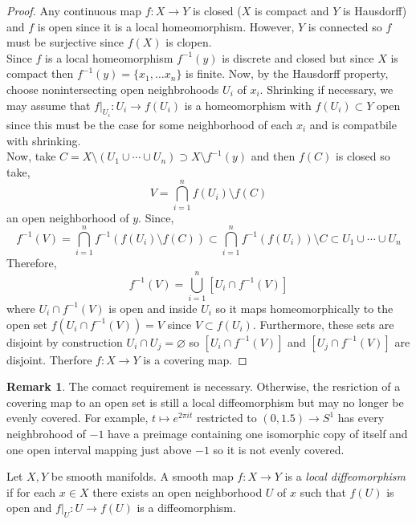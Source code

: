 \documentclass[12pt]{extarticle}
\theoremstyle{definition}
\newtheorem{remark}{Remark}
\newenvironment{definition}[1][Definition:]{\begin{trivlist}
\item[\hskip \labelsep {\bfseries #1}]}{\end{trivlist}}
\begin{document}
\begin{proof}
Any continuous map $f : X \to Y$ is closed ($X$ is compact and $Y$ is Hausdorff) and $f$ is open since it is a local homeomorphism. However, $Y$ is connected so $f$ must be surjective since $f(X)$ is clopen. 
\bigskip\\
Since $f$ is a local homeomorphism $f^{-1}(y)$ is discrete and closed but since $X$ is compact then $f^{-1}(y) = \{ x_1, \dots x_n \}$ is finite. Now, by the Hausdorff property, choose nonintersecting open neighbrohoods $U_i$ of $x_i$. Shrinking if necessary, we may assume that $f|_{U_i} : U_i \to f(U_i)$ is a homeomorphism with $f(U_i) \subset Y$ open since this must be the case for some neighborhood of each $x_i$ and is compatbile with shrinking.  
\bigskip\\
Now, take $C = X \setminus (U_1 \cup \cdots \cup U_n) \supset X \setminus f^{-1}(y)$ and then $f(C)$ is closed so take,
\[ V = \bigcap_{i = 1}^n f(U_i) \setminus f(C) \]
an open neighborhood of $y$. Since,
\[ f^{-1}(V) = \bigcap_{i = 1}^n f^{-1}(f(U_i) \setminus f(C)) \subset \bigcap_{i = 1}^n f^{-1}(f(U_i)) \setminus C \subset U_1 \cup \cdots \cup U_n \]
Therefore,
\[ f^{-1}(V) = \bigcup_{i = 1}^n [U_i \cap f^{-1}(V)] \]
where $U_i \cap f^{-1}(V)$ is open and inside $U_i$ so it maps homeomorphically to the open set $f(U_i \cap f^{-1}(V)) = V$ since $V \subset f(U_i)$. Furthermore, these sets are disjoint by construction $U_i \cap U_j = \varnothing$ so $[U_i \cap f^{-1}(V)]$ and $[U_j \cap f^{-1}(V)]$ are disjoint. Therfore $f : X \to Y$ is a covering map.
\end{proof}

\begin{remark}
The comact requirement is necessary. Otherwise, the resriction of a covering map to an open set is still a local diffeomorphism but may no longer be evenly covered. For example, $t \mapsto e^{2 \pi i t}$ restricted to $(0, 1.5) \to S^1$ has every neighbrohood of $-1$ have a preimage containing one isomorphic copy of itself and one open interval mapping just above $-1$ so it is not evenly covered.
\end{remark}

\begin{definition}
Let $X, Y$ be smooth manifolds. A smooth map $f : X \to Y$ is a \textit{local diffeomorphism} if for each $x \in X$ there exists an open neighborhood $U$ of $x$ such that $f(U)$ is open and $f|_U : U \to f(U)$ is a diffeomorphism.
\end{definition}
\end{document}
